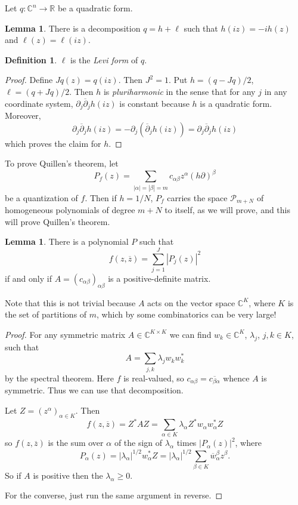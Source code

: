 \documentclass[12pt]{report}
\newcommand{\RR}{\mathbb{R}}
\newcommand{\CC}{\mathbb{C}}
\newcommand{\dbar}{\overline \partial}
\newcommand{\dfn}[1]{\emph{#1}\index{#1}}
\theoremstyle{definition}
\newtheorem{lemma}[theorem]{Lemma}
\newtheorem{definition}[theorem]{Definition}
\begin{document}
    Let $q: \CC^n \to \RR$ be a quadratic form.
\begin{lemma}
    There is a decomposition $q = h + \ell$ such that $h(iz) = -ih(z)$ and $\ell(z) = \ell(iz)$.
\end{lemma}
\begin{definition}
    $\ell$ is the \dfn{Levi form} of $q$.
\end{definition}
\begin{proof}
    Define $Jq(z) = q(iz)$. Then $J^2 = 1$. Put $h = (q - Jq)/2$, $\ell = (q + Jq)/2$. Then $h$ is \dfn{pluriharmonic} in the sense that for any $j$ in any coordinate system, $\partial_j \dbar_j h(iz)$ is constant because $h$ is a quadratic form. Moreover,
    $$\partial_j \dbar_j h(iz) = -\partial_j(\dbar_jh(iz)) = \partial_j \dbar_j h(iz)$$
    which proves the claim for $h$.
\end{proof}
    To prove Quillen's theorem, let
    $$P_f(z) = \sum_{|\alpha| = |\beta| = m} c_{\alpha\beta} z^\alpha (h\partial)^\beta$$
    be a quantization of $f$. Then if $h = 1/N$, $P_f$ carries the space $\mathcal P_{m + N}$ of homogeneous polynomials of degree $m + N$ to itself, as we will prove, and this will prove Quillen's theorem.
\begin{lemma}
    There is a polynomial $P$ such that
    $$f(z, \overline z) = \sum_{j=1}^J |P_j(z)|^2$$
    if and only if $A = (c_{\alpha\beta})_{\alpha\beta}$ is a positive-definite matrix.
\end{lemma}
    Note that this is not trivial because $A$ acts on the vector space $\CC^K$, where $K$ is the set of partitions of $m$, which by some combinatorics can be very large!
\begin{proof}
    For any symmetric matrix $A \in \CC^{K \times K}$ we can find $w_k \in \CC^K$, $\lambda_j$, $j,k \in K$, such that
    $$A = \sum_{j,k} \lambda_j w_k w_k^*$$
    by the spectral theorem. Here $f$ is real-valued, so $c_{\alpha\beta} = \overline{c_{\beta\alpha}}$ whence $A$ is symmetric. Thus we can use that decomposition.

    Let $Z = (z^\alpha)_{\alpha \in K}$. Then
    $$f(z, \overline z) = Z^*AZ = \sum_{\alpha \in K} \lambda_\alpha Z^*w_\alpha w_\alpha^* Z$$
    so $f(z, \overline z)$ is the sum over $\alpha$ of the sign of $\lambda_\alpha$ times $|P_\alpha(z)|^2$, where
    $$P_\alpha(z) = |\lambda_\alpha|^{1/2} w_\alpha^* Z = |\lambda_\alpha|^{1/2} \sum_{\beta \in K} \overline w_\alpha^\beta z^\beta.$$
    So if $A$ is positive then the $\lambda_\alpha \geq 0$.

    For the converse, just run the same argument in reverse. 
\end{proof}
\end{document}
